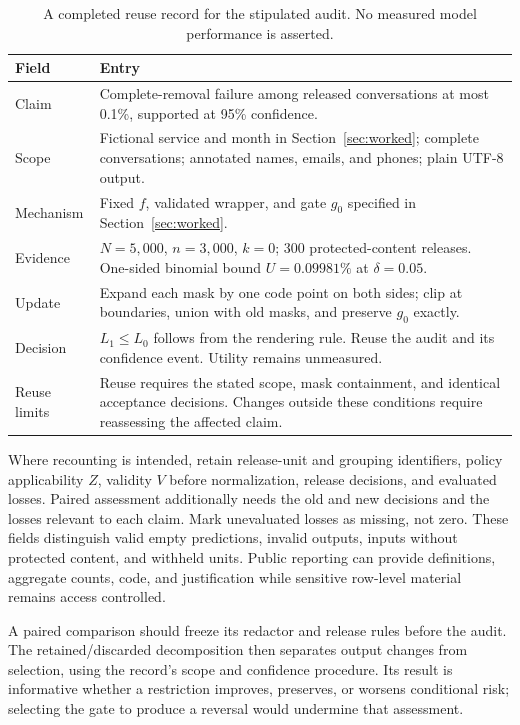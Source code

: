 \documentclass[conference]{IEEEtran}
\begin{document}
\begin{table}[t]
\centering
\caption{A completed reuse record for the stipulated audit. No measured model performance is asserted.}
\label{tab:record}
\small
\begin{tabular}{@{}p{}p{}@{}}
\toprule
Field & Entry \\
\midrule
Claim & Complete-removal failure among released conversations at most 0.1\%, supported at 95\% confidence. \\
Scope & Fictional service and month in Section~\ref{sec:worked}; complete conversations; annotated names, emails, and phones; plain UTF-8 output. \\
Mechanism & Fixed $f$, validated wrapper, and gate $g_0$ specified in Section~\ref{sec:worked}. \\
Evidence & $N=5{,}000$, $n=3{,}000$, $k=0$; 300 protected-content releases. One-sided binomial bound $U=0.09981\%$ at $\delta=0.05$. \\
Update & Expand each mask by one code point on both sides; clip at boundaries, union with old masks, and preserve $g_0$ exactly. \\
Decision & $L_1\leq L_0$ follows from the rendering rule. Reuse the audit and its confidence event. Utility remains unmeasured. \\
Reuse limits & Reuse requires the stated scope, mask containment, and identical acceptance decisions. Changes outside these conditions require reassessing the affected claim. \\
\bottomrule
\end{tabular}
\end{table}

Where recounting is intended, retain release-unit and grouping identifiers, policy applicability $Z$, validity $V$ before normalization, release decisions, and evaluated losses. Paired assessment additionally needs the old and new decisions and the losses relevant to each claim. Mark unevaluated losses as missing, not zero. These fields distinguish valid empty predictions, invalid outputs, inputs without protected content, and withheld units. Public reporting can provide definitions, aggregate counts, code, and justification while sensitive row-level material remains access controlled.

A paired comparison should freeze its redactor and release rules before the audit. The retained/discarded decomposition then separates output changes from selection, using the record's scope and confidence procedure. Its result is informative whether a restriction improves, preserves, or worsens conditional risk; selecting the gate to produce a reversal would undermine that assessment.
\end{document}
